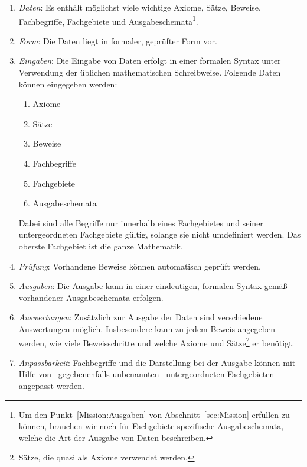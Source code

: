 \documentclass[english,ngerman,parskip=half,headsepline,footsepline]{scrreprt}
\begin{document}
	\begin{enumerate}
		
		\item \label{Ziel:Daten} \emph{Daten}: Es enthält möglichst viele wichtige Axiome, Sätze, Beweise, Fachbegriffe, Fachgebiete und Ausgabeschemata\footnote{ Um den Punkt~\vref{Mission:Ausgaben} von Abschnitt~\vref{sec:Mission} erfüllen zu können, brauchen wir noch für Fachgebiete spezifische Ausgabeschemata, welche die Art der Ausgabe von Daten beschreiben.}.
		
		\item \label{Ziel:Form} \emph{Form}: Die Daten liegt in formaler, geprüfter Form vor.
		
		\item \label{Ziel:Eingaben} \emph{Eingaben}: Die Eingabe von Daten erfolgt in einer formalen Syntax unter Verwendung der üblichen mathematischen Schreibweise. Folgende Daten können eingegeben werden:
		\begin{enumerate}
			\item Axiome
			\item Sätze
			\item Beweise
			\item Fachbegriffe
			\item Fachgebiete
			\item Ausgabeschemata
		\end{enumerate}
		Dabei sind alle Begriffe nur innerhalb eines Fachgebietes und seiner untergeordneten Fachgebiete gültig, solange sie nicht umdefiniert werden. Das oberste Fachgebiet ist die ganze Mathematik.
		
		\item \label{Ziel:Prüfung} \emph{Prüfung}: Vorhandene Beweise können automatisch geprüft werden.
		
		\item \label{Ziel:Ausgaben} \emph{Ausgaben}: Die Ausgabe kann in einer eindeutigen, formalen Syntax gemäß vorhandener Ausgabeschemata erfolgen.
		
		\item \label{Ziel:Auswertungen} \emph{Auswertungen}: Zusätzlich zur Ausgabe der Daten sind verschiedene Auswertungen möglich. Insbesondere kann zu jedem Beweis angegeben werden, wie viele Beweisschritte und welche Axiome und Sätze\footnote{ Sätze, die quasi als Axiome verwendet werden.} er benötigt.
		
		\item \label{Ziel:Anpassbarkeit} \emph{Anpassbarkeit}: Fachbegriffe und die Darstellung bei der Ausgabe können mit Hilfe von \textendash\ gegebenenfalls unbenannten \textendash\ untergeordneten Fachgebieten angepasst werden.
		

\end{enumerate}
\end{document}
